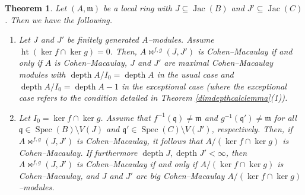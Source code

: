 \documentclass{amsart}%
\newtheorem{theorem}{Theorem}[section]
\theoremstyle{plain}
\numberwithin{equation}{section}
\theoremstyle{definition}
\DeclareMathOperator{\jac}{Jac}
\DeclareMathOperator{\spec}{Spec}
\DeclareMathOperator{\depth}{depth}
\DeclareMathOperator{\height}{ht}
\begin{document}
\begin{theorem}\label{cohenmacthm}
    Let $(A,\mathfrak{m})$ be a local ring with $J\subseteq \jac(B)$ and $J'\subseteq \jac(C)$. Then we have the following.
    \begin{enumerate}
        \item Let $J$ and $J'$ be finitely generated $A$--modules. Assume $\height(\ker f\cap \ker g)=0$. Then, $A\bowtie^{f,g}(J,J')$ is Cohen--Macaulay if and only if $A$ is Cohen--Macaulay, $J$ and $J'$ are maximal Cohen--Macaulay modules with $\depth A/I_0=\depth A$ in the usual case and $\depth A/I_0=\depth A-1$ in the exceptional case (where the exceptional case refers to the condition detailed in Theorem \ref{dimdepthcalclemma}(1)).

        \item  Let $I_0= \ker f\cap\ker g$. Assume that $f^{-1}(\mathfrak{q}) \neq \mathfrak{m}$ and $g^{-1}(\mathfrak{q}') \neq \mathfrak{m}$ for all $\mathfrak{q}\in \spec (B)\setminus V(J)$ and $\mathfrak{q}'\in\spec (C)\setminus V(J')$, respectively. Then, if $A\bowtie^{f,g}(J,J')$ is Cohen--Macaulay, it follows that $A/(\ker f\cap \ker g)$ is Cohen--Macaulay. If furthermore $\depth J,\depth J'<\infty$, then $A\bowtie^{f,g}(J,J')$ is Cohen--Macaulay if and only if $A/(\ker f\cap \ker g)$ is Cohen--Macaulay, and $J$ and $J'$ are big Cohen--Macaulay $A/(\ker f\cap \ker g)$--modules. 
    \end{enumerate}
\end{theorem}
\end{document}

